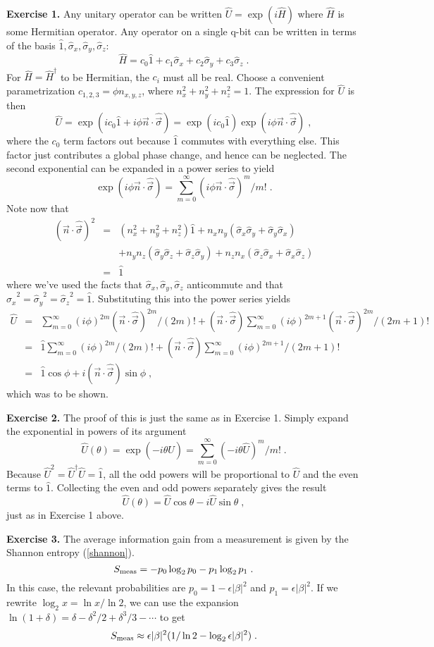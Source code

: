 \documentclass[12pt]{article}
\def\sx{{\hat\sigma_x}}
\def\sy{{\hat\sigma_y}}
\def\sz{{\hat\sigma_z}}
\def\svec{{\hat{\vec\sigma}}}
\def\nvec{{\vec n}}
\def\id{{\hat 1}}
\def\H{{\hat H}}
\def\U{{\hat U}}
\def\Udag{{\hat U^\dagger}}
\begin{document}
{\bf Exercise 1.}  Any unitary operator can be written
$\U = \exp(i\H)$ where $\H$ is some Hermitian operator.  Any operator on
a single q-bit can be written in terms of the basis $\id,\sx,\sy,\sz$:
\[
\H = c_0 \id + c_1 \sx + c_2 \sy + c_3 \sz \;.
\]
For $\H=\H^\dagger$ to be Hermitian, the $c_i$ must all be real.  Choose
a convenient parametrization $c_{1,2,3} = \phi n_{x,y,z}$, where
$n_x^2 + n_y^2 + n_z^2 = 1$.  The expression for $\U$ is then
\[
\U = \exp(i c_0 \id + i\phi\nvec\cdot\svec)
  = \exp(i c_0 \id) \exp(i\phi\nvec\cdot\svec) \;,
\]
where the $c_0$ term factors out because $\id$ commutes with everything
else.  This factor just contributes a global phase change, and hence
can be neglected.  The second exponential can be expanded in a power
series to yield
\[
\exp(i\phi\nvec\cdot\svec)
  = \sum_{m=0}^\infty (i\phi\nvec\cdot\svec)^m/m! \;.
\]
Note now that
\begin{eqnarray}
(\nvec\cdot\svec)^2 &=& (n_x^2+n_y^2+n_z^2) \id
  + n_x n_y (\sx\sy + \sy\sx) \nonumber\\
&& + n_y n_z (\sy\sz + \sz\sy)
  + n_z n_x (\sz\sx + \sx\sz) \nonumber\\
&=& \id \, \nonumber
\end{eqnarray}
where we've used the facts that $\sx,\sy,\sz$ anticommute and that
$\sx^2 = \sy^2 = \sz^2 = \id$.  Substituting this into the power series
yields
\begin{eqnarray}
\U &=& \sum_{m=0}^\infty (i\phi)^{2m} (\nvec\cdot\svec)^{2m}/(2m)!
 + (\nvec\cdot\svec) \sum_{m=0}^\infty (i\phi)^{2m+1}
  (\nvec\cdot\svec)^{2m}/(2m+1)! \nonumber\\
&=& \id \sum_{m=0}^\infty (i\phi)^{2m}/(2m)!
 + (\nvec\cdot\svec) \sum_{m=0}^\infty (i\phi)^{2m+1}/(2m+1)! \nonumber\\
&=& \id \cos\phi + i(\nvec\cdot\svec)\sin\phi \;, \nonumber
\end{eqnarray}
which was to be shown.

{\bf Exercise 2.}  The proof of this is just the same as in Exercise 1.
Simply expand the exponential in powers of its argument
\[
\U(\theta) = \exp(-i\theta\U) = \sum_{m=0}^\infty (-i\theta\U)^m/m! \;.
\]
Because $\U^2=\Udag\U=\id$, all the odd
powers will be proportional to $\U$ and the even terms to $\id$.
Collecting the even and odd powers separately gives the result
\[
\U(\theta) = \U \cos\theta - i \U \sin\theta \;,
\]
just as in Exercise 1 above.


{\bf Exercise 3.}  The average information gain from a
measurement is given by the Shannon entropy (\ref{shannon}).
\[
S_{\rm meas} = - p_0 \log_2 p_0 - p_1 \log_2 p_1 \;.
\]
In this case, the relevant probabilities are $p_0 = 1-\epsilon|\beta|^2$
and $p_1 = \epsilon|\beta|^2$.  If we rewrite $\log_2 x = \ln x/\ln 2$,
we can use the expansion $\ln(1+\delta) = \delta - \delta^2/2
+ \delta^3/3 - \cdots$ to get
\[
S_{\rm meas}
  \approx  \epsilon|\beta|^2(1/\ln 2 - \log_2 \epsilon|\beta|^2) \;.
\]
\end{document}
